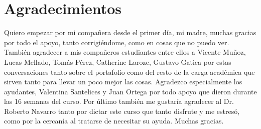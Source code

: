 \documentclass[../portafolio.tex]{subfiles}
\begin{document}
\chapter*{Agradecimientos}

Quiero empezar por mi compañera desde el primer día, mi madre, muchas gracias por todo el apoyo, tanto corrigiéndome, como en cosas que no puedo ver. También agradecer a mis compañeros estudiantes entre ellos a Vicente Muñoz, Lucas Mellado, Tomás Pérez, Catherine Laroze, Gustavo Gatica por estas conversaciones tanto sobre el portafolio como del resto de la carga académica que sirven tanto para llevar un poco mejor las cosas. Agradezco especialmente los ayudantes, Valentina Santelices y Juan Ortega por todo apoyo que dieron durante las 16 semanas del curso. Por último también me gustaría agradecer al Dr. Roberto Navarro tanto por dictar este curso que tanto disfrute y me estresó, como por la cercanía al tratarse de necesitar su ayuda. Muchas gracias.

\medskip
\end{document}

